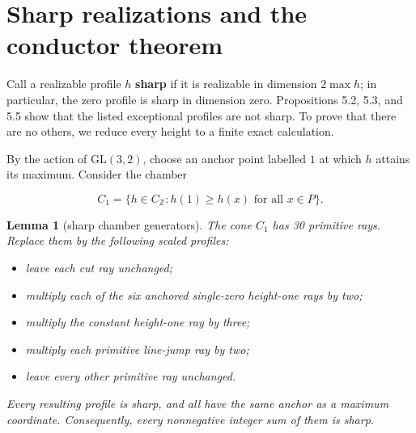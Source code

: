 \documentclass[11pt]{article}
\newtheorem{lemma}[theorem]{Lemma}
\theoremstyle{remark}
\numberwithin{equation}{section}
\begin{document}
\section{Sharp realizations and the conductor theorem}


Call a realizable profile $h$ \textbf{sharp} if it is realizable in dimension
$2\max h$; in particular, the zero profile is sharp in dimension zero.
Propositions 5.2, 5.3, and 5.5 show that the listed exceptional
profiles are not sharp. To prove that there are no others, we reduce every
height to a finite exact calculation.

By the action of $\mathrm{GL}(3,2)$, choose an anchor point labelled $1$ at
which $h$ attains its maximum. Consider the chamber

\nopagebreak[4]
\[
C_1=\{h\in C_{\mathbb Z}:h(1)\ge h(x)\text{ for all }x\in P\}.
\tag{6.1}
\]

\Needspace{0.28\textheight}
\begin{lemma}[sharp chamber generators]

The cone $C_1$ has 30 primitive rays. Replace them by the following scaled
profiles:

\begin{itemize}
\item leave each cut ray unchanged;
\item multiply each of the six anchored single-zero height-one rays by two;
\item multiply the constant height-one ray by three;
\item multiply each primitive line-jump ray by two;
\item leave every other primitive ray unchanged.

\end{itemize}

Every resulting profile is sharp, and all have the same anchor as a maximum
coordinate. Consequently, every nonnegative integer sum of them is sharp.

\end{lemma}
\end{document}
